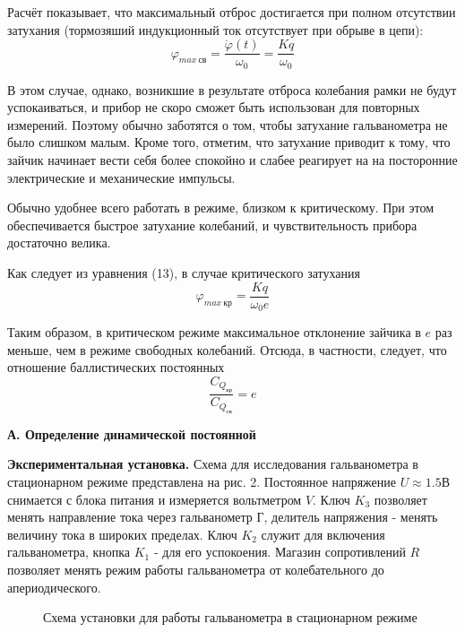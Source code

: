 \documentclass[14pt]{article}
\begin{document}
Расчёт показывает, что максимальный отброс достигается при полном отсутствии затухания (тормозяший индукционный ток отсутствует
при обрыве в цепи):
\begin{equation}
	\varphi_{max~\text{св}} = \frac{\dot{\varphi}(t)}{\omega_0} = \frac{Kq}{\omega_0}
\end{equation}

В этом случае, однако, возникшие в результате отброса колебания рамки не будут успокаиваться, и прибор не скоро сможет быть использован для повторных измерений. Поэтому обычно заботятся о том, чтобы затухание гальванометра не было слишком малым. Кроме того, отметим, что затухание приводит к тому, что зайчик начинает вести себя более
спокойно и слабее реагирует на на посторонние электрические и механические импульсы.

Обычно удобнее всего работать в режиме, близком к критическому. При этом обеспечивается быстрое затухание колебаний, и чувствительность прибора достаточно велика.

Как следует из уравнения (13), в случае критического затухания
\begin{equation}
	\varphi_{max~\text{кр}} = \frac{Kq}{\omega_0e}
\end{equation}

Таким образом, в критическом режиме максимальное отклонение зайчика в $e$ раз меньше, чем в режиме свободных колебаний. Отсюда, в частности, следует, что отношение баллистических постоянных 
$$
	\frac{C_{Q_\text{кр}}}{C_{Q_\text{св}}} = e
$$

\vspace{1cm}
\textbf{А. Определение динамической постоянной}

\textbf{Экспериментальная установка.} Схема для исследования гальванометра в стационарном режиме представлена на рис. 2. Постоянное напряжение $U \approx 1.5$В снимается с блока питания и измеряется вольтметром $V$. Ключ $K_3$ позволяет менять направление тока через гальванометр $\text{Г}$, делитель напряжения - менять величину тока в широких пределах. Ключ $K_2$ служит для включения гальванометра, кнопка $K_1$ - для его успокоения. Магазин сопротивлений $R$ позволяет менять режим работы гальванометра от колебательного до апериодического.

\begin{figure}[h!]
	\caption{Схема установки для работы гальванометра в стационарном режиме}
	\label{fig:image}
\end{figure}
\end{document}
